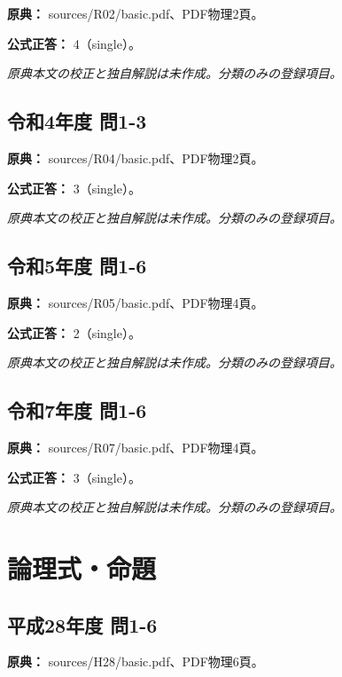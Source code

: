 \noindent\textbf{原典：} sources/R02/basic.pdf、PDF物理2頁。

\textbf{公式正答：} 4（single）。

\par\textit{原典本文の校正と独自解説は未作成。分類のみの登録項目。}

\subsection{令和4年度 問1-3}
\label{q:r04-reg-basic-1-3}

\noindent\textbf{原典：} sources/R04/basic.pdf、PDF物理2頁。

\textbf{公式正答：} 3（single）。

\par\textit{原典本文の校正と独自解説は未作成。分類のみの登録項目。}

\subsection{令和5年度 問1-6}
\label{q:r05-reg-basic-1-6}

\noindent\textbf{原典：} sources/R05/basic.pdf、PDF物理4頁。

\textbf{公式正答：} 2（single）。

\par\textit{原典本文の校正と独自解説は未作成。分類のみの登録項目。}

\subsection{令和7年度 問1-6}
\label{q:r07-reg-basic-1-6}

\noindent\textbf{原典：} sources/R07/basic.pdf、PDF物理4頁。

\textbf{公式正答：} 3（single）。

\par\textit{原典本文の校正と独自解説は未作成。分類のみの登録項目。}

\section{論理式・命題}

\subsection{平成28年度 問1-6}
\label{q:h28-reg-basic-1-6}

\noindent\textbf{原典：} sources/H28/basic.pdf、PDF物理6頁。


